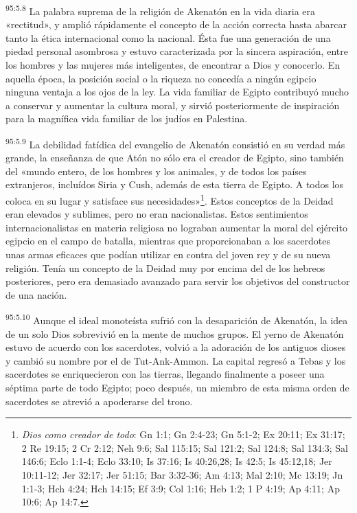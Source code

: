 \par
\textsuperscript{95:5.8} La palabra suprema de la religión de Akenatón en la vida diaria era «rectitud», y amplió rápidamente el concepto de la acción correcta hasta abarcar tanto la ética internacional como la nacional. Ésta fue una generación de una piedad personal asombrosa y estuvo caracterizada por la sincera aspiración, entre los hombres y las mujeres más inteligentes, de encontrar a Dios y conocerlo. En aquella época, la posición social o la riqueza no concedía a ningún egipcio ninguna ventaja a los ojos de la ley. La vida familiar de Egipto contribuyó mucho a conservar y aumentar la cultura moral, y sirvió posteriormente de inspiración para la magnífica vida familiar de los judíos en Palestina.

\par
\textsuperscript{95:5.9} La debilidad fatídica del evangelio de Akenatón consistió en su verdad más grande, la enseñanza de que Atón no sólo era el creador de Egipto, sino también del «mundo entero, de los hombres y los animales, y de todos los países extranjeros, incluídos Siria y Cush, además de esta tierra de Egipto. A todos los coloca en su lugar y satisface sus necesidades»\footnote{\textit{Dios como creador de todo}: Gn 1:1; Gn 2:4-23; Gn 5:1-2; Ex 20:11; Ex 31:17; 2 Re 19:15; 2 Cr 2:12; Neh 9:6; Sal 115:15; Sal 121:2; Sal 124:8; Sal 134:3; Sal 146:6; Eclo 1:1-4; Eclo 33:10; Is 37:16; Is 40:26,28; Is 42:5; Is 45:12,18; Jer 10:11-12; Jer 32:17; Jer 51:15; Bar 3:32-36; Am 4:13; Mal 2:10; Mc 13:19; Jn 1:1-3; Hch 4:24; Hch 14:15; Ef 3:9; Col 1:16; Heb 1:2; 1 P 4:19; Ap 4:11; Ap 10:6; Ap 14:7.}. Estos conceptos de la Deidad eran elevados y sublimes, pero no eran nacionalistas. Estos sentimientos internacionalistas en materia religiosa no lograban aumentar la moral del ejército egipcio en el campo de batalla, mientras que proporcionaban a los sacerdotes unas armas eficaces que podían utilizar en contra del joven rey y de su nueva religión. Tenía un concepto de la Deidad muy por encima del de los hebreos posteriores, pero era demasiado avanzado para servir los objetivos del constructor de una nación.

\par
\textsuperscript{95:5.10} Aunque el ideal monoteísta sufrió con la desaparición de Akenatón, la idea de un solo Dios sobrevivió en la mente de muchos grupos. El yerno de Akenatón estuvo de acuerdo con los sacerdotes, volvió a la adoración de los antiguos dioses y cambió su nombre por el de Tut-Ank-Ammon. La capital regresó a Tebas y los sacerdotes se enriquecieron con las tierras, llegando finalmente a poseer una séptima parte de todo Egipto; poco después, un miembro de esta misma orden de sacerdotes se atrevió a apoderarse del trono.

